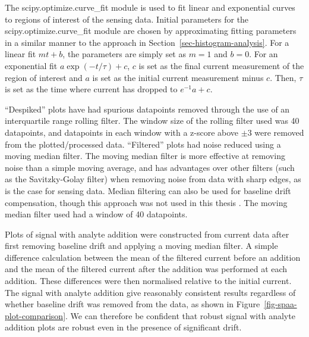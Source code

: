 \documentclass[
  a4paper,
]{scrbook}
\begin{document}
The scipy.optimize.curve\_fit module is used to fit linear and
exponential curves to regions of interest of the sensing data. Initial
parameters for the scipy.optimize.curve\_fit module are chosen by
approximating fitting parameters in a similar manner to the approach in
Section~\ref{sec-histogram-analysis}. For a linear fit \(mt + b\), the
parameters are simply set as \(m=1\) and \(b=0\). For an exponential fit
\(a\exp{(-t/\tau)} + c\), \(c\) is set as the final current measurement
of the region of interest and \(a\) is set as the initial current
measurement minus \(c\). Then, \(\tau\) is set as the time where current
has dropped to \(e^{-1}a + c\).

``Despiked'' plots have had spurious datapoints removed through the use
of an interquartile range rolling filter. The window size of the rolling
filter used was 40 datapoints, and datapoints in each window with a
z-score above \(\pm 3\) were removed from the plotted/processed data.
``Filtered'' plots had noise reduced using a moving median filter. The
moving median filter is more effective at removing noise than a simple
moving average, and has advantages over other filters (such as the
Savitzky-Golay filter) when removing noise from data with sharp edges,
as is the case for sensing data. Median filtering can also be used for
baseline drift compensation, though this approach was not used in this
thesis \autocite{Stone2011}. The moving median filter used had a window
of 40 datapoints.

Plots of signal with analyte addition were constructed from current data
after first removing baseline drift and applying a moving median filter.
A simple difference calculation between the mean of the filtered current
before an addition and the mean of the filtered current after the
addition was performed at each addition. These differences were then
normalised relative to the initial current. The signal with analyte
addition give reasonably consistent results regardless of whether
baseline drift was removed from the data, as shown in
Figure~\ref{fig-spaa-plot-comparison}. We can therefore be confident
that robust signal with analyte addition plots are robust even in the
presence of significant drift.
\end{document}
